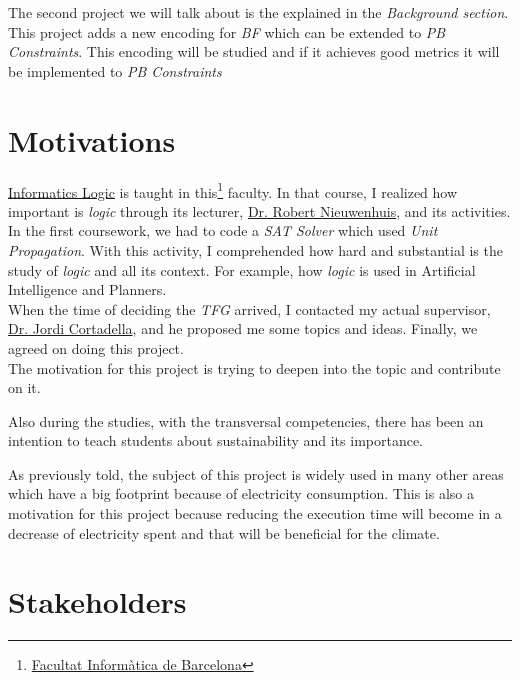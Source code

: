 The second project we will talk about is the explained in the \emph{Background section}. This project adds a new encoding for \emph{BF} which can be extended to \emph{PB Constraints}. This encoding will be studied and if it achieves good metrics it will be implemented to \emph{PB Constraints}


\section{Motivations}

\href{https://www.fib.upc.edu/en/studies/bachelors-degrees/bachelor-degree-informatics-engineering/curriculum/syllabus/LI}{Informatics Logic} is taught in this\footnote{\href{https://www.fib.upc.edu/en/}{Facultat Informàtica de Barcelona}} faculty. In that course, I realized how important is \emph{logic} through its lecturer, \href{http://www.lsi.upc.es/~roberto/}{Dr. Robert Nieuwenhuis}, and its activities. \\

In the first coursework, we had to code a \emph{SAT Solver} which used \emph{Unit Propagation}.
With this activity, I comprehended how hard and substantial is the study of \emph{logic} and all its context. For example, how \emph{logic} is used in Artificial Intelligence and Planners.\\

When the time of deciding the \emph{TFG} arrived, I contacted my actual supervisor, \href{https://www.cs.upc.edu/~jordicf/}{Dr. Jordi Cortadella}, and he proposed me some topics and ideas. Finally, we agreed on doing this project. \\

The motivation for this project is trying to deepen into the topic and contribute on it.

Also during the studies, with the transversal competencies, there has been an intention to teach students about sustainability and its importance. %

As previously told, the subject of this project is widely used in many other areas which have a big footprint because of electricity consumption. This is also a motivation for this project because reducing the execution time will become in a decrease of electricity spent and that will be beneficial for the climate.  

\section{Stakeholders}

